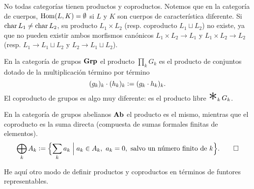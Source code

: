 \documentclass{article}
\numberwithin{equation}{section}
\theoremstyle{definition}
\begin{document}
\begin{ejemplo}
  No todas categorías tienen productos y coproductos. Notemos que en
  la categoría de cuerpos, $\operatorname{Hom} (L,K) = \emptyset$ si $L$ y $K$ son cuerpos
  de característica diferente. Si $\operatorname{char} L_1 \ne \operatorname{char} L_2$, su producto
  $L_1\times L_2$ (resp. coproducto $L_1\sqcup L_2$) no existe, ya que no pueden
  existir ambos morfismos canónicos $L_1\times L_2\to L_1$ y
  $L_1\times L_2\to L_2$ (resp. $L_1\to L_1\sqcup L_2$ y
  $L_2\to L_1\sqcup L_2$).
\end{ejemplo}

\begin{ejemplo}
  En la categoría de grupos $\text{\bf Grp}$ el producto $\prod_k G_k$ es
  el producto de conjuntos dotado de la multiplicación término por término
  $$(g_k)_k\cdot (h_k)_k \mathrel{\mathop:}= (g_k\cdot h_k)_k.$$
  El coproducto de grupos es algo muy diferente: es el producto libre $\bigast_k G_k$.

  En la categoría de grupos abelianos $\text{\bf Ab}$ el producto es el mismo,
  mientras que el coproducto es la suma directa (compuesta de sumas formales
  finitas de elementos).
  \[ \bigoplus_k A_k \mathrel{\mathop:}=
       \Bigl\{ \sum_k a_k \Bigm| a_k\in A_k, ~
         a_k = 0, \text{ salvo un número finito de }k \Bigr\}. \qedhere \]
\end{ejemplo}

He aquí otro modo de definir productos y coproductos en términos de funtores
representables.
\end{document}
